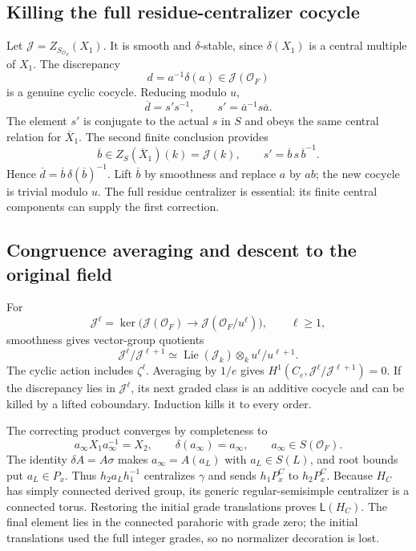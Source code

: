 \documentclass[11pt,a4paper]{article}
\theoremstyle{definition}
\theoremstyle{remark}
\begin{document}
\subsection{Killing the full residue-centralizer cocycle}
Let \(\mathscr J=Z_{S_{\mathcal O_F}}(X_1)\). It is smooth and
\(\delta\)-stable, since \(\delta(X_1)\) is a central multiple of
\(X_1\). The discrepancy
\[
d=a^{-1}\delta(a)\in\mathscr J(\mathcal O_F)
\]
is a genuine cyclic cocycle. Reducing modulo \(u\),
\[
\overline d=s's^{-1},\qquad
s'=\overline a^{-1}s\overline a.
\]
The element \(s'\) is conjugate to the actual \(s\) in \(S\) and
obeys the same central relation for \(\overline X_1\).
The second finite conclusion provides
\[
\overline b\in Z_S(\overline X_1)(k)=\mathscr J(k),\qquad
s'=\overline b\,s\,\overline b^{-1}.
\]
Hence \(\overline d=\overline b\,\delta(\overline b)^{-1}\).
Lift \(\overline b\) by smoothness and replace \(a\) by \(ab\);
the new cocycle is trivial modulo \(u\).
The full residue centralizer is essential: its finite central
components can supply the first correction.

\subsection{Congruence averaging and descent to the original field}
For
\[
\mathscr J^\ell=
\ker\bigl(\mathscr J(\mathcal O_F)\to
\mathscr J(\mathcal O_F/u^\ell)\bigr),\qquad \ell\ge1,
\]
smoothness gives vector-group quotients
\[
\mathscr J^\ell/\mathscr J^{\ell+1}
\simeq\operatorname{Lie}(\mathscr J_k)\otimes_k
u^\ell/u^{\ell+1}.
\]
The cyclic action includes \(\zeta^\ell\). Averaging by \(1/e\)
gives \(H^1(C_e,\mathscr J^\ell/\mathscr J^{\ell+1})=0\).
If the discrepancy lies in \(\mathscr J^\ell\), its next graded
class is an additive cocycle and can be killed by a lifted
coboundary. Induction kills it to every order.

The correcting product converges by completeness to
\[
a_\infty X_1a_\infty^{-1}=X_2,\qquad
\delta(a_\infty)=a_\infty,\qquad a_\infty\in S(\mathcal O_F).
\]
The identity \(\delta A=A\sigma\) makes \(a_\infty=A(a_L)\) with
\(a_L\in S(L)\), and root bounds put \(a_L\in P_x\).
Thus \(h_2a_Lh_1^{-1}\) centralizes \(\gamma\) and sends
\(h_1P_x^C\) to \(h_2P_x^C\).
Because \(H_C\) has simply connected derived group, its generic
regular-semisimple centralizer is a connected torus. Restoring the
initial grade translations proves \(\mathsf L(H_C)\).
The final element lies in the connected parahoric with grade zero;
the initial translations used the full integer grades, so no
normalizer decoration is lost.
\end{document}
